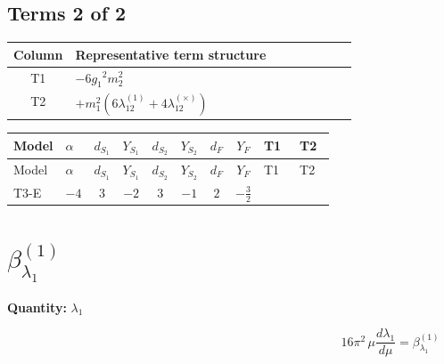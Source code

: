 \documentclass[8pt]{article}
\begin{document}
\begin{landscape}
\subsection*{Terms 2 of 2}
\begin{center}
\begin{tabular}{@{}c >{\raggedright\arraybackslash}p{0.82\linewidth}@{}}
\toprule
Column & Representative term structure \\
\midrule
T1 & \(\displaystyle -6 {g_1}^2 {m_2^2}\) \\
\midrule
T2 & \(\displaystyle +{m_1^2} (6 {\lambda_{12}^{(1)}}+4 {\lambda_{12}^{(\times)}})\) \\
\midrule
\bottomrule
\end{tabular}
\end{center}
\smallskip
\tiny
\begin{longtable}{@{}llcccccc >{\raggedright\arraybackslash}p{0.21\linewidth} >{\raggedright\arraybackslash}p{0.21\linewidth}@{}}
\toprule
Model & $\alpha$ & $d_{S_1}$ & $Y_{S_1}$ & $d_{S_2}$ & $Y_{S_2}$ & $d_F$ & $Y_F$ & T1 & T2 \\
\midrule
\endfirsthead
\toprule
Model & $\alpha$ & $d_{S_1}$ & $Y_{S_1}$ & $d_{S_2}$ & $Y_{S_2}$ & $d_F$ & $Y_F$ & T1 & T2 \\
\midrule
\endhead
T3-E & $-4$ & $3$ & $-2$ & $3$ & $-1$ & $2$ & $-\frac{3}{2}$ & \scriptsize\adjustbox{max width=\linewidth}{$\begin{gathered} -6 {g_1}^2 {m_2^2}\end{gathered}$} & \scriptsize\adjustbox{max width=\linewidth}{$\begin{gathered} +{m_1^2} (6 {\lambda_{12}^{(1)}}+4 {\lambda_{12}^{(\times)}})\end{gathered}$} \\
\midrule
\bottomrule
\end{longtable}
\clearpage
\section*{$\beta_{\lambda_1}^{(1)}$}
\noindent\textbf{Quantity: }$\lambda_1$\par\smallskip
\[16\pi^2\,\mu\frac{d \lambda_1}{d\mu}=\beta_{\lambda_1}^{(1)}\]

\end{landscape}
\end{document}
